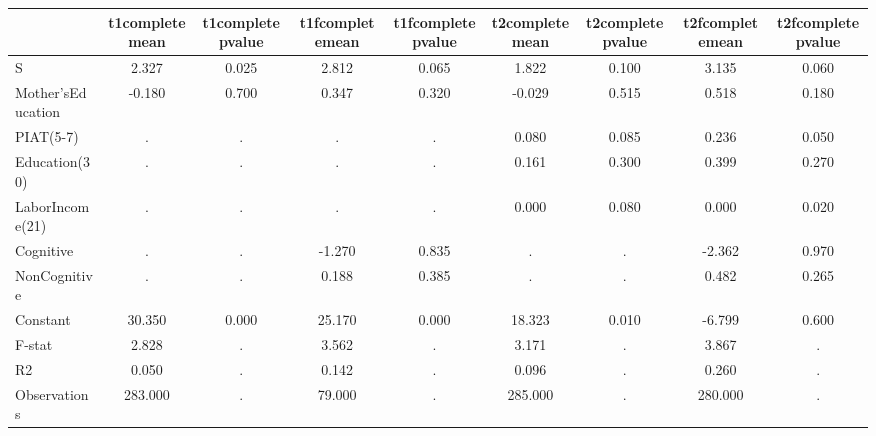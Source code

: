 \begin{table}[htbp]
\begin{tabular}{lcccccccc} \hline \hline
 & t1completemean  & t1completepvalue  & t1fcompletemean  & t1fcompletepvalue  & t2completemean  & t2completepvalue  & t2fcompletemean  & t2fcompletepvalue  \\  \hline 
S &     2.327 &     0.025 &     2.812 &     0.065 &     1.822 &     0.100 &     3.135 &     0.060 \\  
Mother'sEducation &    -0.180 &     0.700 &     0.347 &     0.320 &    -0.029 &     0.515 &     0.518 &     0.180 \\  
PIAT(5-7) &         . &         . &         . &         . &     0.080 &     0.085 &     0.236 &     0.050 \\  
Education(30) &         . &         . &         . &         . &     0.161 &     0.300 &     0.399 &     0.270 \\  
LaborIncome(21) &         . &         . &         . &         . &     0.000 &     0.080 &     0.000 &     0.020 \\  
Cognitive &         . &         . &    -1.270 &     0.835 &         . &         . &    -2.362 &     0.970 \\  
NonCognitive &         . &         . &     0.188 &     0.385 &         . &         . &     0.482 &     0.265 \\  
Constant &    30.350 &     0.000 &    25.170 &     0.000 &    18.323 &     0.010 &    -6.799 &     0.600 \\  
F-stat &     2.828 &         . &     3.562 &         . &     3.171 &         . &     3.867 &         . \\  
R2 &     0.050 &         . &     0.142 &         . &     0.096 &         . &     0.260 &         . \\  
Observations &   283.000 &         . &    79.000 &         . &   285.000 &         . &   280.000 &         . \\  
\hline \hline \end{tabular}
\end{table}
